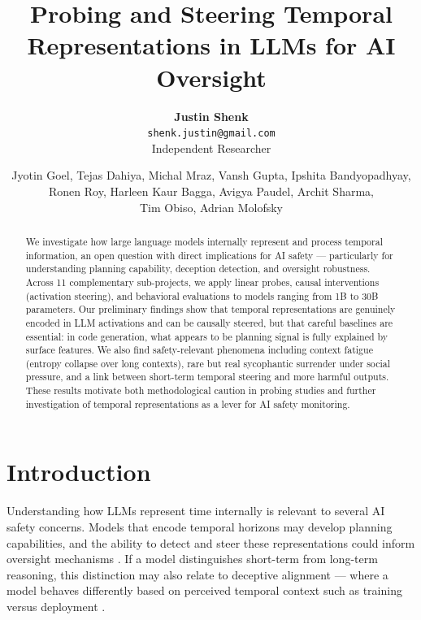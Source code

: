 \documentclass[midterm]{sparreport}
\title{Probing and Steering Temporal Representations in LLMs for AI Oversight}
\author{
  \textbf{Justin Shenk}\\
  \texttt{shenk.justin@gmail.com}\\
  Independent Researcher
  \and
  Jyotin Goel,
  Tejas Dahiya,
  Michal Mraz,
  Vansh Gupta,
  Ipshita Bandyopadhyay,\\
  Ronen Roy,
  Harleen Kaur Bagga,
  Avigya Paudel,
  Archit Sharma,\\
  Tim Obiso,
  Adrian Molofsky
}
\begin{document}
\maketitle

\begin{abstract}
We investigate how large language models internally represent and process temporal information, an open question with direct implications for AI safety --- particularly for understanding planning capability, deception detection, and oversight robustness. Across 11 complementary sub-projects, we apply linear probes, causal interventions (activation steering), and behavioral evaluations to models ranging from 1B to 30B parameters. Our preliminary findings show that temporal representations are genuinely encoded in LLM activations and can be causally steered, but that careful baselines are essential: in code generation, what appears to be planning signal is fully explained by surface features. We also find safety-relevant phenomena including context fatigue (entropy collapse over long contexts), rare but real sycophantic surrender under social pressure, and a link between short-term temporal steering and more harmful outputs. These results motivate both methodological caution in probing studies and further investigation of temporal representations as a lever for AI safety monitoring.
\end{abstract}


\section{Introduction}

Understanding how LLMs represent time internally is relevant to several AI safety concerns. Models that encode temporal horizons may develop planning capabilities, and the ability to detect and steer these representations could inform oversight mechanisms \cite{li2023inference, rimsky2024steering}. If a model distinguishes short-term from long-term reasoning, this distinction may also relate to deceptive alignment \cite{hubinger2019risks} --- where a model behaves differently based on perceived temporal context such as training versus deployment \cite{park2023ai}.
\end{document}
